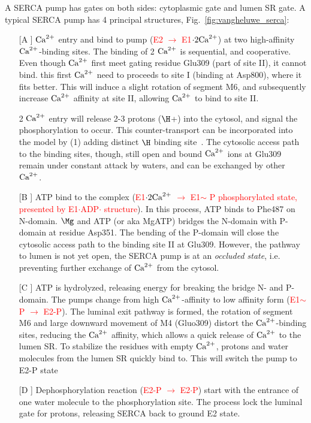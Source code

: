 A SERCA pump has gates on both sides: cytoplasmic gate and lumen SR
gate. A typical SERCA pump has 4 principal structures,
Fig.~\ref{fig:vangheluwe_serca}:
\begin{enumerate}
\item [[A]] ${\text{Ca}^{2+}}$ entry and bind to pump
  (\textcolor{red}{E2 $\rightarrow$ E1$\cdot 2{\text{Ca}^{2+}}$}) at two
  high-affinity ${\text{Ca}^{2+}}$-binding sites. The binding of 2 ${\text{Ca}^{2+}}$ is
  sequential, and cooperative. Even though ${\text{Ca}^{2+}}$ first meet gating
  residue Glu309 (part of site II), it cannot bind. this first ${\text{Ca}^{2+}}$
  need to proceeds to site I (binding at Asp800), where it fits
  better. This will induce a slight rotation of segment M6, and
  subsequently increase ${\text{Ca}^{2+}}$ affinity at site II, allowing ${\text{Ca}^{2+}}$ to
  bind to site II.

  2 ${\text{Ca}^{2+}}$ entry will release 2-3 protons ($\H$+) into the cytosol, and
  signal the phosphorylation to occur. This counter-transport can be
  incorporated into the model by (1) adding distinct $\H$ binding
  site~\citep{tran2009}.  The cytosolic access path to the binding
  sites, though, still open and bound ${\text{Ca}^{2+}}$ ions at Glu309 remain
  under constant attack by waters, and can be exchanged by other
  ${\text{Ca}^{2+}}$.

\item [[B]] ATP bind to the complex
  (\textcolor{red}{E1$\cdot 2{\text{Ca}^{2+}}$ $\rightarrow$ E1$\sim$ P
    phosphorylated state, presented by E1$\cdot$ADP$\cdot$
    structure}).
  In this process, ATP binds to Phe487 on N-domain. $\Mg$ and ATP
  (or aka MgATP) bridges the N-domain with P-domain at residue Asp351.
  The bending of the P-domain will close the cytosolic access path to
  the binding site II at Glu309. However, the pathway to lumen is not
  yet open, the SERCA pump is at an {\it occluded state},
  i.e. preventing further exchange of ${\text{Ca}^{2+}}$ from the cytosol.

\item [[C]] ATP is hydrolyzed, releasing energy for breaking the
  bridge N- and P-domain. The pumps change from high ${\text{Ca}^{2+}}$-affinity to
  low affinity form (\textcolor{red}{E1$\sim$P $\rightarrow$ E2-P}).
  The luminal exit pathway is formed, the rotation of segment M6 and
  large downward movement of M4 (Gluo309) distort the ${\text{Ca}^{2+}}$-binding
  sites, reducing the ${\text{Ca}^{2+}}$ affinity, which allows a quick release of
  ${\text{Ca}^{2+}}$ to the lumen SR. To stabilize the residues with empty ${\text{Ca}^{2+}}$,
  protons and water molecules from the lumen SR quickly bind to. This
  will switch the pump to E2-P state


\item [[D]] Dephosphorylation reaction
  (\textcolor{red}{E2-P $\rightarrow$ E2$\cdot$P}) start with the
  entrance of one water molecule to the phosphorylation site. The
  process lock the luminal gate for protons, releasing SERCA back to
  ground E2 state.
\end{enumerate}


